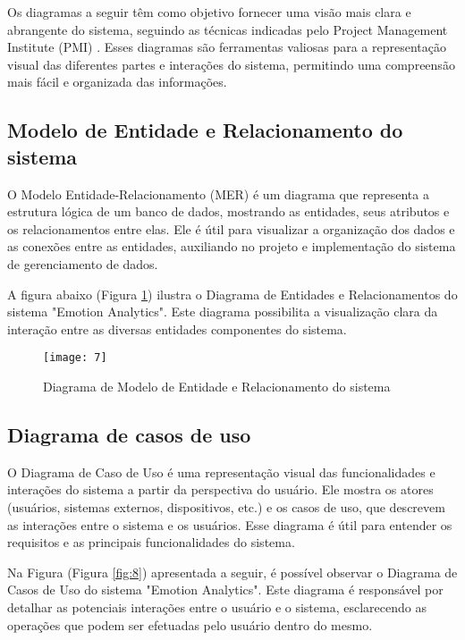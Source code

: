 Os diagramas a seguir têm como objetivo fornecer uma visão mais clara e abrangente do sistema, seguindo as técnicas indicadas pelo Project Management Institute (PMI) \cite{31}. Esses diagramas são ferramentas valiosas para a representação visual das diferentes partes e interações do sistema, permitindo uma compreensão mais fácil e organizada das informações.

\subsection{Modelo de Entidade e Relacionamento do sistema}

O Modelo Entidade-Relacionamento (MER) \cite{26} é um diagrama que representa a estrutura lógica de um banco de dados, mostrando as entidades, seus atributos e os relacionamentos entre elas. Ele é útil para visualizar a organização dos dados e as conexões entre as entidades, auxiliando no projeto e implementação do sistema de gerenciamento de dados.

A figura abaixo (Figura \ref{fig:7}) ilustra o Diagrama de Entidades e Relacionamentos do sistema "Emotion Analytics". Este diagrama possibilita a visualização clara da interação entre as diversas entidades componentes do sistema.

\begin{figure}[h]
  \caption{Diagrama de Modelo de Entidade e Relacionamento do sistema}
  \centering
  \texttt{[image: 7]}
  \label{fig:7}
\end{figure}
\FloatBarrier

\clearpage
\subsection{Diagrama de casos de uso}

O Diagrama de Caso de Uso \cite{27} é uma representação visual das funcionalidades e interações do sistema a partir da perspectiva do usuário. Ele mostra os atores (usuários, sistemas externos, dispositivos, etc.) e os casos de uso, que descrevem as interações entre o sistema e os usuários. Esse diagrama é útil para entender os requisitos e as principais funcionalidades do sistema.

Na Figura (Figura \ref{fig:8}) apresentada a seguir, é possível observar o Diagrama de Casos de Uso do sistema "Emotion Analytics". Este diagrama é responsável por detalhar as potenciais interações entre o usuário e o sistema, esclarecendo as operações que podem ser efetuadas pelo usuário dentro do mesmo.

